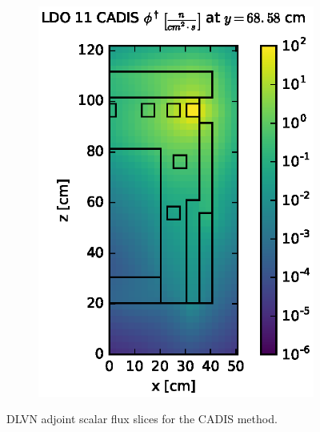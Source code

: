 \begin{figure}[!htb]
\begin{subfigure}{0.4\textwidth}
\includegraphics[max height=0.445\textheight]
{img/dlvn-plots/cad-adj/flux-ldo11-slice.eps}
\end{subfigure}
\caption{DLVN adjoint scalar flux slices for the CADIS method.}
\label{dlvn-cad-adj-slices}
\end{figure}

